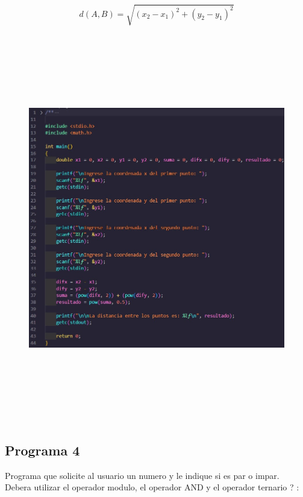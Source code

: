 \documentclass{article}
\begin{document}
$$d(A, B) = \sqrt{(x_2 - x_1)^2 + (y_2 - y_1)^2}$$

\begin{figure}[H]
    \centering
    \includegraphics[height = 17cm]{img3.jpg}
\end{figure}

\newpage

\subsection{Programa 4}

Programa que solicite al usuario un numero y le indique si es par o impar. Debera utilizar el operador modulo, el operador AND y el operador ternario ? :
\end{document}
